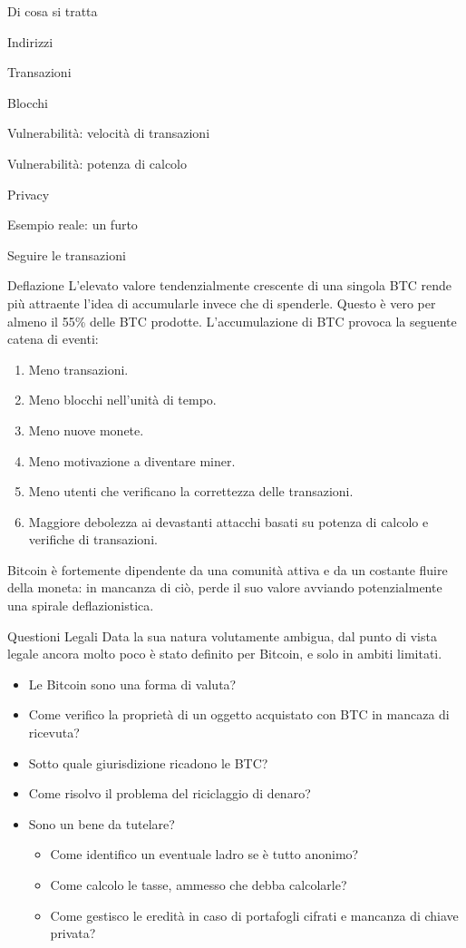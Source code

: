\documentclass[italian]{beamer}
\begin{document}
\begin{frame}{Di cosa si tratta}
\begin{frame}{Indirizzi}
\begin{frame}{Transazioni}
\begin{frame}{Blocchi}
\begin{frame}{Vulnerabilità: velocità di transazioni}
\begin{frame}{Vulnerabilità: potenza di calcolo}
\begin{frame}{Privacy}
\begin{frame}{Esempio reale: un furto}
\begin{frame}{Seguire le transazioni}
\begin{frame}{Deflazione}
 L'elevato valore tendenzialmente crescente di una singola BTC rende più attraente l'idea di accumularle invece che di spenderle. Questo è vero per almeno il 55\% delle BTC prodotte. L'accumulazione di BTC provoca la seguente catena di eventi:
 \begin{enumerate}
  \item Meno transazioni. \pause
  \item Meno blocchi nell'unità di tempo. \pause
  \item Meno nuove monete. \pause
  \item Meno motivazione a diventare miner. \pause
  \item Meno utenti che verificano la correttezza delle transazioni. \pause
  \item Maggiore debolezza ai devastanti attacchi basati su potenza di calcolo e verifiche di transazioni. \pause
 \end{enumerate}
 Bitcoin è fortemente dipendente da una comunità attiva e da un costante fluire della moneta: in mancanza di ciò, perde il suo valore avviando potenzialmente una spirale deflazionistica.
\end{frame}

\begin{frame}{Questioni Legali}
  Data la sua natura volutamente ambigua, dal punto di vista legale ancora molto poco è stato definito per Bitcoin, e solo in ambiti limitati.\pause
  \begin{itemize}
   \item Le Bitcoin sono una forma di valuta? \pause
   \item Come verifico la proprietà di un oggetto acquistato con BTC in mancaza di ricevuta?\pause
   \item Sotto quale giurisdizione ricadono le BTC? \pause
   \item Come risolvo il problema del riciclaggio di denaro? \pause
   \item Sono un bene da tutelare?\pause
   \begin{itemize}
    \item Come identifico un eventuale ladro se è tutto anonimo? \pause
    \item Come calcolo le tasse, ammesso che debba calcolarle? \pause
    \item Come gestisco le eredità in caso di portafogli cifrati e mancanza di chiave privata?
   \end{itemize}
  \end{itemize}
\end{frame}


\end{frame}
\end{frame}
\end{frame}
\end{frame}
\end{frame}
\end{frame}
\end{frame}
\end{frame}
\end{frame}
\end{document}

